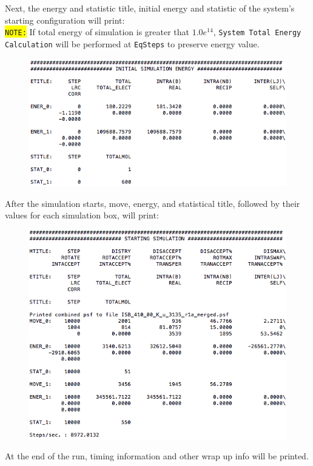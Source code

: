 \newpage
Next, the energy and statistic title, initial energy and statistic of the system's starting configuration will print:\\
\colorbox{yellow}{\texttt{NOTE:}} If total energy of simulation is greater that $1.0 e^{14}$, \texttt{System Total Energy Calculation} will be performed at \texttt{EqSteps} to preserve energy value.
\begin{figure}[H]
\includegraphics[scale=0.7]{images/out3}
\end{figure}
After the simulation starts, move, energy, and statistical title, followed by their values for each simulation box, will print:
\begin{figure}[H]
\includegraphics[scale=0.7]{images/out4}
\end{figure}
At the end of the run, timing information and other wrap up info will be printed.\\\\
